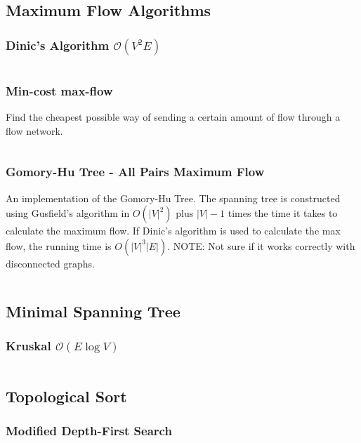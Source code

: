 \documentclass[8pt,a4paper,landscape,oneside]{amsart}
\newcommand{\mintedstyle}[2]{\inputminted[fontsize=\normalsize,baselinestretch=.9,breaklines,tabsize=2]{#1}{code/#2}}
\newcommand{\code}[1]{\mintedstyle{cpp}{#1}}
\begin{document}
\begin{multicols*}{3}
\subsection{Maximum Flow Algorithms}
\subsubsection{Dinic's Algorithm $\mathcal{O}(V^{2} E)$}
\code{graphs/dinic.cpp}

\subsubsection{Min-cost max-flow}
Find the cheapest possible way of sending a certain amount of flow through a flow network.
\code{graphs/mincostmaxflow.cpp}

\subsubsection{Gomory-Hu Tree - All Pairs Maximum Flow}
An implementation of the Gomory-Hu Tree. The spanning tree is constructed using Gusfield's algorithm
in $O(|V| ^ 2)$ plus $|V|-1$ times the time it takes to calculate the maximum flow.
If Dinic's algorithm is used to calculate the max flow, the running time is $O(|V|^3|E|)$.
NOTE: Not sure if it works correctly with disconnected graphs.
\code{graphs/gomory_hu_tree.cpp}

\subsection{Minimal Spanning Tree}

\subsubsection{Kruskal $\mathcal{O}(E \log V)$}
\code{graphs/mst_kruskal.cpp}

\subsection{Topological Sort}
\subsubsection{Modified Depth-First Search}
\code{graphs/tsort.cpp}


\end{multicols*}
\end{document}
